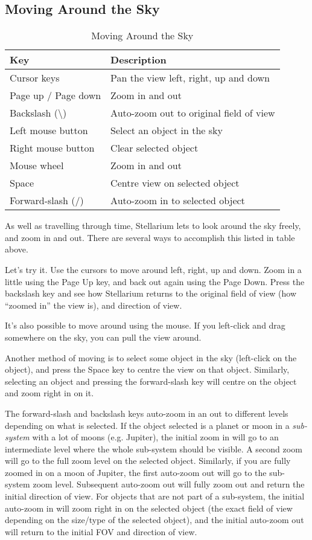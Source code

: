 \subsection{Moving Around the Sky}\label{moving-around-the-sky}

\begin{table}[h]
\centering
\begin{tabular}{l l}
\toprule
\textbf{Key} & \textbf{Description}\\
\midrule
Cursor keys & Pan the view left, right, up and down \\
Page up / Page down & Zoom in and out \\
Backslash (\textbackslash{}) & Auto-zoom out to original field of
view \\
Left mouse button & Select an object in the sky \\
Right mouse button & Clear selected object \\
Mouse wheel & Zoom in and out \\ 
Space & Centre view on selected object \\
Forward-slash (/) & Auto-zoom in to selected object \\
\bottomrule
\end{tabular}
\caption{Moving Around the Sky}
\end{table}

As well as travelling through time, Stellarium lets to look around the
sky freely, and zoom in and out. There are several ways to accomplish
this listed in table above.

Let's try it. Use the cursors to move around left, right, up and down.
Zoom in a little using the Page Up key, and back out again using the
Page Down. Press the backslash key and see how Stellarium returns to the
original field of view (how ``zoomed in'' the view is), and direction of
view.

It's also possible to move around using the mouse. If you left-click and
drag somewhere on the sky, you can pull the view around.

Another method of moving is to select some object in the sky (left-click
on the object), and press the Space key to centre the view on that
object. Similarly, selecting an object and pressing the forward-slash
key will centre on the object and zoom right in on it.

The forward-slash and backslash keys auto-zoom in an out to different
levels depending on what is selected. If the object selected is a planet
or moon in a \emph{sub-system} with a lot of moons (e.g. Jupiter), the
initial zoom in will go to an intermediate level where the whole
sub-system should be visible. A second zoom will go to the full zoom
level on the selected object. Similarly, if you are fully zoomed in on a
moon of Jupiter, the first auto-zoom out will go to the sub-system zoom
level. Subsequent auto-zoom out will fully zoom out and return the
initial direction of view. For objects that are not part of a
sub-system, the initial auto-zoom in will zoom right in on the selected
object (the exact field of view depending on the size/type of the
selected object), and the initial auto-zoom out will return to the
initial FOV and direction of view.


